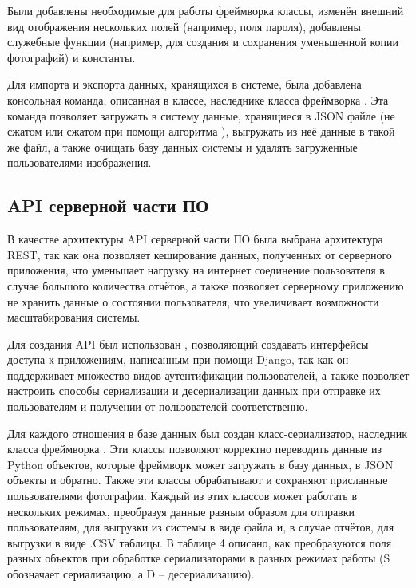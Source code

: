 \tab
Были добавлены необходимые для работы фреймворка  классы, изменён внешний вид отображения нескольких полей (например, поля пароля), добавлены служебные функции (например, для создания и сохранения уменьшенной копии фотографий) и константы.

\tab
Для импорта и экспорта данных, хранящихся в системе, была добавлена консольная команда, описанная в классе, наследнике класса  фреймворка .
Эта команда позволяет загружать в систему данные, хранящиеся в JSON файле (не сжатом или сжатом при помощи алгоритма ), выгружать из неё данные в такой же файл, а также очищать базу данных системы и удалять загруженные пользователями изображения.

\subsection{API серверной части ПО}

\tab
В качестве архитектуры API серверной части ПО была выбрана архитектура REST\cite{rest-better}, так как она позволяет кеширование данных, полученных от серверного приложения, что уменьшает нагрузку на интернет соединение пользователя в случае большого количества отчётов, а также позволяет серверному приложению не хранить данные о состоянии пользователя, что увеличивает возможности масштабирования системы.

\tab
Для создания API был использован , позволяющий создавать интерфейсы доступа к приложениям, написанным при помощи Django, так как он поддерживает множество видов аутентификации пользователей, а также позволяет настроить способы сериализации и десериализации данных при отправке их пользователям и получении от пользователей соответственно.

\tab
Для каждого отношения в базе данных был создан класс-сериализатор, наследник класса  фреймворка .
Эти классы позволяют корректно переводить данные из Python объектов, которые фреймворк  может загружать в базу данных, в JSON объекты и обратно.
Также эти классы обрабатывают и сохраняют присланные пользователями фотографии.
Каждый из этих классов может работать в нескольких режимах, преобразуя данные разным образом для отправки пользователям, для выгрузки из системы в виде файла и, в случае отчётов, для выгрузки в виде .CSV таблицы.
В таблице 4 описано, как преобразуются поля разных объектов при обработке сериализаторами в разных режимах работы (S обозначает сериализацию, а D -- десериализацию).
\tablefour

